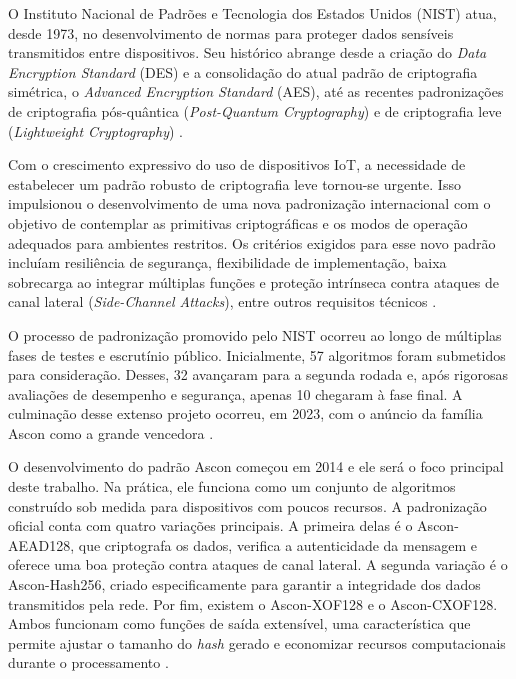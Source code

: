 O Instituto Nacional de Padrões e Tecnologia dos Estados Unidos (NIST) atua, desde 1973, no desenvolvimento de normas para proteger dados sensíveis transmitidos entre dispositivos. Seu histórico abrange desde a criação do \textit{Data Encryption Standard} (DES) e a consolidação do atual padrão de criptografia simétrica, o \textit{Advanced Encryption Standard} (AES), até as recentes padronizações de criptografia pós-quântica (\textit{Post-Quantum Cryptography}) e de criptografia leve (\textit{Lightweight Cryptography}) \cite{chen2022cornerstone}.

Com o crescimento expressivo do uso de dispositivos IoT, a necessidade de estabelecer um padrão robusto de criptografia leve tornou-se urgente. Isso impulsionou o desenvolvimento de uma nova padronização internacional com o objetivo de contemplar as primitivas criptográficas e os modos de operação adequados para ambientes restritos. Os critérios exigidos para esse novo padrão incluíam resiliência de segurança, flexibilidade de implementação, baixa sobrecarga ao integrar múltiplas funções e proteção intrínseca contra ataques de canal lateral (\textit{Side-Channel Attacks}), entre outros requisitos técnicos \cite{nistir8114}.

O processo de padronização promovido pelo NIST ocorreu ao longo de múltiplas fases de testes e escrutínio público. Inicialmente, 57 algoritmos foram submetidos para consideração. Desses, 32 avançaram para a segunda rodada e, após rigorosas avaliações de desempenho e segurança, apenas 10 chegaram à fase final. A culminação desse extenso projeto ocorreu, em 2023, com o anúncio da família Ascon como a grande vencedora \cite{ascon_official}.

O desenvolvimento do padrão Ascon começou em 2014 e ele será o foco principal deste trabalho. Na prática, ele funciona como um conjunto de algoritmos construído sob medida para dispositivos com poucos recursos. A padronização oficial conta com quatro variações principais. A primeira delas é o Ascon-AEAD128, que criptografa os dados, verifica a autenticidade da mensagem e oferece uma boa proteção contra ataques de canal lateral. A segunda variação é o Ascon-Hash256, criado especificamente para garantir a integridade dos dados transmitidos pela rede. Por fim, existem o Ascon-XOF128 e o Ascon-CXOF128. Ambos funcionam como funções de saída extensível, uma característica que permite ajustar o tamanho do \textit{hash} gerado e economizar recursos computacionais durante o processamento \cite{nist2025ascon}.

